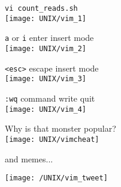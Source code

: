 \documentclass[xcolor=dvipsnames]{beamer}
\begin{document}
\begin{frame}[fragile]
	\begin{center}
		\Large
		\verb!vi count_reads.sh! \\
		\vspace{1cm}
		\texttt{[image: UNIX/vim\_1]}
	\end{center}
\end{frame}

\begin{frame}[fragile]
	\begin{center}
		\Large
		\verb!a! or \verb!i! enter insert mode \\
		\vspace{1cm}
		\texttt{[image: UNIX/vim\_2]}
	\end{center}
\end{frame}

\begin{frame}[fragile]
	\begin{center}
		\Large
		\verb!<esc>! escape insert mode\\
		\vspace{1cm}
		\texttt{[image: UNIX/vim\_3]}
	\end{center}
\end{frame}

\begin{frame}[fragile]
	\begin{center}
		\Large
		\verb!:wq! command write quit\\
		\vspace{1cm}
		\texttt{[image: UNIX/vim\_4]}
	\end{center}
\end{frame}

\begin{frame}
	\begin{center}
		\Huge
		Why is that monster popular?\\
		\vspace{1cm}
		\texttt{[image: UNIX/vimcheat]}
	\end{center}
	\hfill and memes...
\end{frame}

\begin{frame}
	\begin{center}
		\texttt{[image: /UNIX/vim\_tweet]}
	\end{center}
\end{frame}
\end{document}
